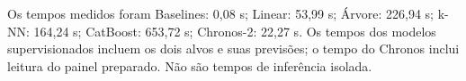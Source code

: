 Os tempos medidos foram Baselines: 0,08 s; Linear: 53,99 s; Árvore: 226,94 s; k-NN: 164,24 s; CatBoost: 653,72 s; Chronos-2: 22,27 s. Os tempos dos modelos supervisionados incluem os dois alvos e suas previsões; o tempo do Chronos inclui leitura do painel preparado. Não são tempos de inferência isolada.